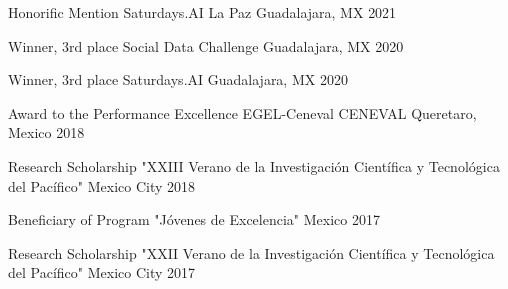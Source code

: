 


\begin{cvhonors}

  \cvhonor
    {Honorific Mention} %
    {Saturdays.AI La Paz} %
    {Guadalajara, MX} %
    {2021} %

  \cvhonor
    {Winner, 3rd place} %
    {Social Data Challenge} %
    {Guadalajara, MX} %
    {2020} %
    
\end{cvhonors}


\begin{cvhonors}

  \cvhonor
    {Winner, 3rd place} %
    {Saturdays.AI} %
    {Guadalajara, MX} %
    {2020} %

  \cvhonor
    {Award to the Performance Excellence EGEL-Ceneval} %
    {CENEVAL} %
    {Queretaro, Mexico} %
    {2018} %

  \cvhonor
    {Research Scholarship} %
    {"XXIII Verano de la Investigación Científica y Tecnológica del Pacífico"} %
    {Mexico City} %
    {2018} %
    
  \cvhonor
    {Beneficiary of Program} %
    {"Jóvenes de Excelencia"} %
    {Mexico} %
    {2017} %

  \cvhonor
    {Research Scholarship} %
    {"XXII Verano de la Investigación Científica y Tecnológica del Pacífico"} %
    {Mexico City} %
    {2017} %

\end{cvhonors}
